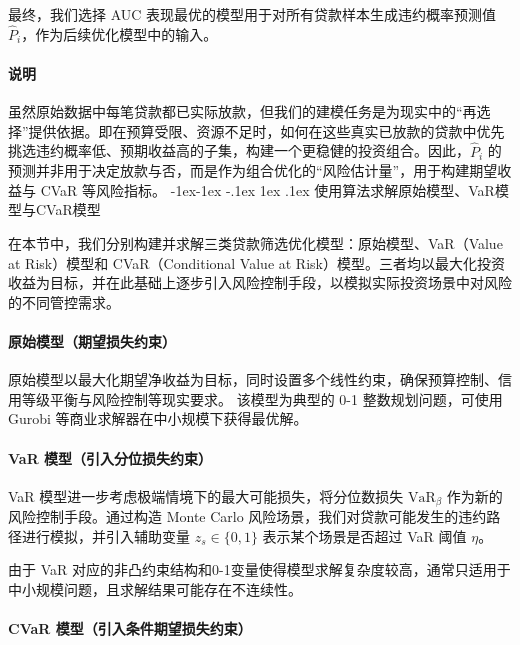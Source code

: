 \documentclass[nonblindrev]{write_paper}
\makeatletter
\renewcommand\subsection{\@startsection{subsection}{2}{\z@}%
                                     {-1ex\@plus -1ex \@minus -.1ex}%
                                     {1ex \@plus .1ex}%
                                     {\normalfont \normalsize \bfseries}}
\makeatother
\begin{document}
最终，我们选择 AUC 表现最优的模型用于对所有贷款样本生成违约概率预测值 $\hat{P}_i$，作为后续优化模型中的输入。

\paragraph{说明}
虽然原始数据中每笔贷款都已实际放款，但我们的建模任务是为现实中的“再选择”提供依据。即在预算受限、资源不足时，如何在这些真实已放款的贷款中优先挑选违约概率低、预期收益高的子集，构建一个更稳健的投资组合。因此，$\hat{P}_i$ 的预测并非用于决定放款与否，而是作为组合优化的“风险估计量”，用于构建期望收益与 CVaR 等风险指标。
\subsection{使用算法求解原始模型、VaR模型与CVaR模型}
\label{subsec:model_solving}

在本节中，我们分别构建并求解三类贷款筛选优化模型：原始模型、VaR（Value at Risk）模型和 CVaR（Conditional Value at Risk）模型。三者均以最大化投资收益为目标，并在此基础上逐步引入风险控制手段，以模拟实际投资场景中对风险的不同管控需求。

\vspace{1em}
\paragraph{原始模型（期望损失约束）}
原始模型以最大化期望净收益为目标，同时设置多个线性约束，确保预算控制、信用等级平衡与风险控制等现实要求。
该模型为典型的 0-1 整数规划问题，可使用 Gurobi 等商业求解器在中小规模下获得最优解。

\vspace{1em}
\paragraph{VaR 模型（引入分位损失约束）}

VaR 模型进一步考虑极端情境下的最大可能损失，将分位数损失 $\text{VaR}_\beta$ 作为新的风险控制手段。通过构造 Monte Carlo 风险场景，我们对贷款可能发生的违约路径进行模拟，并引入辅助变量 $z_s \in \{0,1\}$ 表示某个场景是否超过 VaR 阈值 $\eta$。

由于 VaR 对应的非凸约束结构和0-1变量使得模型求解复杂度较高，通常只适用于中小规模问题，且求解结果可能存在不连续性。

\vspace{1em}
\paragraph{CVaR 模型（引入条件期望损失约束）}
\end{document}
